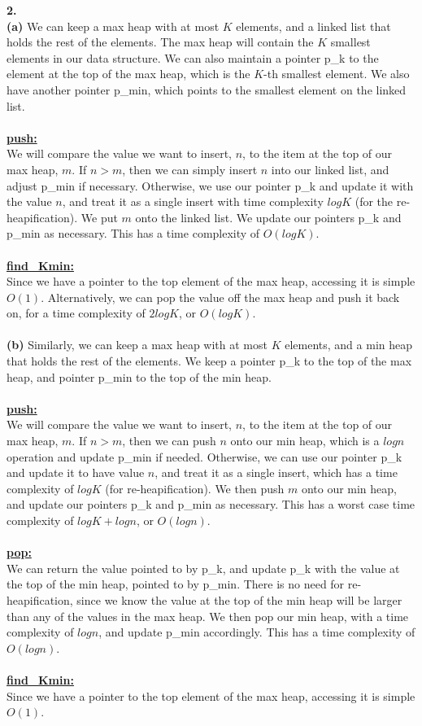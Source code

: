 \documentclass[10pt, letterpaper]{report}
\begin{document}
\newpage
\noindent \large{\textbf{2.} } \\
\textbf{(a)} We can keep a max heap with at most $K$ elements, and a linked list that holds the rest of the elements. The max heap will contain the $K$ smallest elements in our data structure. We can also maintain a pointer p\_k to the element at the top of the max heap, which is the $K$-th smallest element. We also have another pointer p\_min, which points to the smallest element on the linked list. \\
\\
\textbf{\underline{push:}}\\
We will compare the value we want to insert, $n$, to the item at the top of our max heap, $m$. If $n > m$, then we can simply insert $n$ into our linked list, and adjust p\_min if necessary. Otherwise, we use our pointer p\_k and update it with the value $n$, and treat it as a single insert with time complexity $logK$ (for the re-heapification). We put $m$ onto the linked list. We update our pointers p\_k and p\_min as necessary. This has a time complexity of $O(logK)$.\\
\\
\textbf{\underline{find\_Kmin:}}\\
Since we have a pointer to the top element of the max heap, accessing it is simple $O(1)$. Alternatively, we can pop the value off the max heap and push it back on, for a time complexity of $2logK$, or $O(logK)$.\\
\\
\textbf{(b)} Similarly, we can keep a max heap with at most $K$ elements, and a min heap that holds the rest of the elements. We keep a pointer p\_k to the top of the max heap, and pointer p\_min to the top of the min heap. \\
\\
\textbf{\underline{push:}}\\
We will compare the value we want to insert, $n$, to the item at the top of our max heap, $m$. If $n > m$, then we can push $n$ onto our min heap, which is a $logn$ operation and update p\_min if needed. Otherwise, we can use our pointer p\_k and update it to have value $n$, and treat it as a single insert, which has a time complexity of $logK$ (for re-heapification). We then push $m$ onto our min heap, and update our pointers p\_k and p\_min as necessary. This has a worst case time complexity of $logK + logn$, or $O(logn)$.\\
\\
\textbf{\underline{pop:}}\\
We can return the value pointed to by p\_k, and update p\_k with the value at the top of the min heap, pointed to by p\_min. There is no need for re-heapification, since we know the value at the top of the min heap will be larger than any of the values in the max heap. We then pop our min heap, with a time complexity of $logn$, and update p\_min accordingly. This has a time complexity of $O(logn)$.\\
\\
\textbf{\underline{find\_Kmin:}}\\
Since we have a pointer to the top element of the max heap, accessing it is simple $O(1)$.\\
\end{document}
